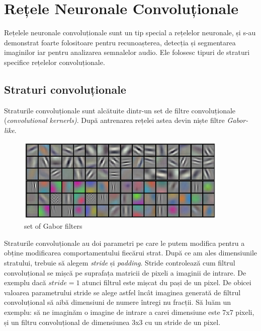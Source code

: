 \section{Rețele Neuronale Convoluționale}
Rețelele neuronale convoluționale sunt un tip special a rețelelor neuronale, și s-au demonstrat foarte folositoare pentru recunoașterea, detecția și segmentarea imaginilor iar pentru analizarea semnalelor audio.\newline
Ele folosesc tipuri de straturi specifice rețelelor convoluționale.

\subsection{Straturi convoluționale}
Straturile convoluționale sunt alcătuite dintr-un set de filtre convoluționale (\textit{convolutional kernerls)}. După antrenarea rețelei astea devin niște filtre \textit{Gabor-like}.

\begin{figure}[h!]
    	\centering
	\captionsetup{justification=centering, margin=2cm}
	\includegraphics[width=0.9\textwidth]{figures/gabor_filters.png}
	\caption{set of Gabor filters \cite{gabor_filters}}
	\label{fig:set of Gabor filters}
\end{figure}

Straturile convoluționale au doi parametri pe care le putem modifica pentru a obține modificarea comportamentului fiecărui strat. După ce am ales dimensiunile stratului, trebuie să alegem \textit{stride} și \textit{padding}. \newline
Stride controlează cum filtrul convoluțional se mișcă pe suprafața matricii de pixeli a imaginii de intrare. \newline
De exemplu dacă $stride=1$ atunci filtrul este mișcat du pași de un pixel. De obicei valoarea parametrului stride se alege astfel încât imaginea generată de filtrul convoluțional să aibă dimensiuni de numere întregi nu fracții. Să luăm un exemplu: să ne imaginăm o imagine de intrare a carei dimensiune este 7x7 pixeli, și un filtru convoluțional de dimensiunea 3x3 cu un stride de un pixel.

